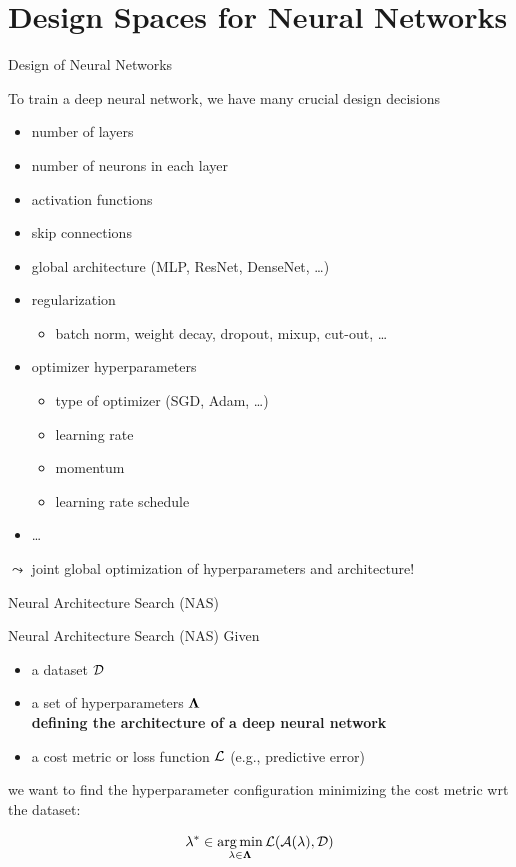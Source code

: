 \section{Design Spaces for Neural Networks}
\begin{frame}[c]{Design of Neural Networks}

To train a deep neural network, we have many crucial design decisions \hands
\pause

\begin{itemize}
  \item number of layers
  \item number of neurons in each layer
  \item activation functions
  \item skip connections
  \item global architecture (MLP, ResNet, DenseNet, \ldots)
  \item regularization
  \begin{itemize}
    \item batch norm, weight decay, dropout, mixup, cut-out, \ldots 
  \end{itemize}
  \item optimizer hyperparameters
  \begin{itemize}
    \item type of optimizer (SGD, Adam, \ldots)
    \item learning rate
    \item momentum
    \item learning rate schedule
  \end{itemize}
  \item \ldots
\end{itemize}

$\leadsto$ joint global optimization of hyperparameters and architecture!

\end{frame}
\begin{frame}[c]{Neural Architecture Search (NAS)}

\begin{block}{Neural Architecture Search (NAS)}
Given
\begin{itemize}
  \item a dataset $\mathcal{D}$
  \item a set of hyperparameters $\mathbf{\Lambda}$\\ \textbf{defining the architecture of a deep neural network}
  \item a cost metric or loss function $\mathcal{L}$ (e.g., predictive error)
\end{itemize}
we want to find the hyperparameter configuration minimizing the cost metric wrt the dataset:

\begin{equation}
\mathbf{\lambda}^* \in \operatorname*{arg\,min}_{\mathbf{\lambda} \in \mathbf{\Lambda}} \mathcal{L}(\mathcal{A}(\mathbf{\lambda}), \mathcal{D}) \nonumber
\end{equation}
\end{block}

\end{frame}
